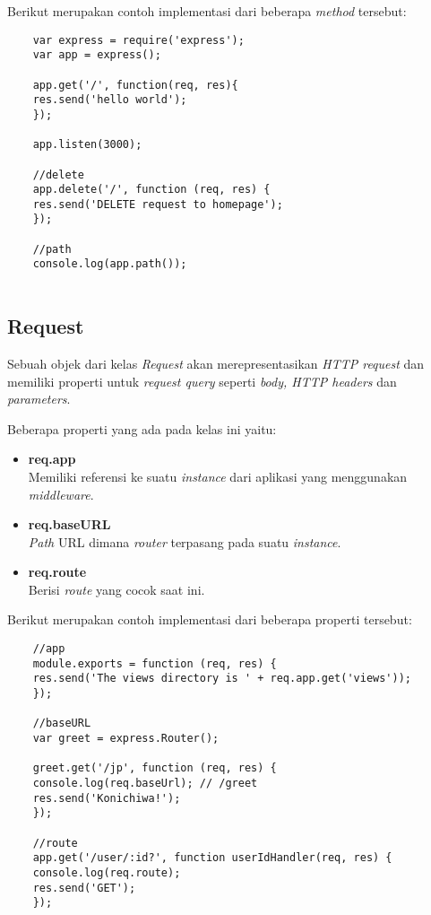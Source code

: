 Berikut merupakan contoh implementasi dari beberapa \textit{method} tersebut:

\begin{lstlisting}
	var express = require('express');
	var app = express();
	
	app.get('/', function(req, res){
	res.send('hello world');
	});
	
	app.listen(3000);
	
	//delete
	app.delete('/', function (req, res) {
	res.send('DELETE request to homepage');
	});
	
	//path
	console.log(app.path());
	
\end{lstlisting}

\subsection{Request}
Sebuah objek dari kelas \textit{Request} akan merepresentasikan \textit{HTTP request} dan memiliki properti untuk \textit{request query} seperti \textit{body, HTTP headers} dan \textit{parameters}.

Beberapa properti yang ada pada kelas ini yaitu:

\begin{itemize}
	\item \textbf{req.app} \\ Memiliki referensi ke suatu \textit{instance} dari aplikasi yang menggunakan \textit{middleware}.
	
	\item \textbf{req.baseURL} \\ \textit{Path} URL dimana \textit{router} terpasang pada suatu \textit{instance}.
	
	\item \textbf{req.route} \\ Berisi \textit{route} yang cocok saat ini.
	
\end{itemize} 

Berikut merupakan contoh implementasi dari beberapa properti tersebut:

\begin{lstlisting}
	//app
	module.exports = function (req, res) {
	res.send('The views directory is ' + req.app.get('views'));
	});
	
	//baseURL
	var greet = express.Router();
	
	greet.get('/jp', function (req, res) {
	console.log(req.baseUrl); // /greet
	res.send('Konichiwa!');
	});
	
	//route
	app.get('/user/:id?', function userIdHandler(req, res) {
	console.log(req.route);
	res.send('GET');
	});
\end{lstlisting}

